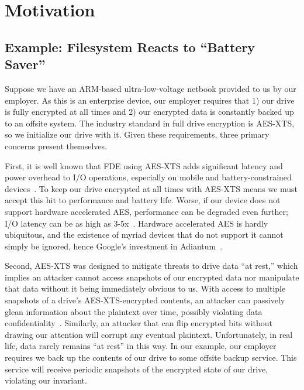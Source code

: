 \section{Motivation}\label{sec:motivation}

\subsection{Example: Filesystem Reacts to ``Battery Saver''}


Suppose we have an ARM-based ultra-low-voltage netbook provided to us by our
employer. As this is an enterprise device, our employer requires that 1) our
drive is fully encrypted at all times and 2) our encrypted data is constantly
backed up to an offsite system. The industry standard in full drive encryption
is AES-XTS, so we initialize our drive with it. Given these requirements, three
primary concerns present themselves.

First, it is well known that FDE using AES-XTS adds significant latency and
power overhead to I/O operations, especially on mobile and battery-constrained
devices~\cite{google-engadget, android-M-mobile-motivation,
android-M-mobile-motivation-2}. To keep our drive encrypted at all times with
AES-XTS means we must accept this hit to performance and battery life. Worse, if
our device does not support hardware accelerated AES, performance can be
degraded even further; I/O latency can be as high as 3-5x~\cite{StrongBox}.
Hardware accelerated AES is hardly ubiquitous, and the existence of myriad
devices that do not support it cannot simply be ignored, hence Google's
investment in Adiantum~\cite{Adiantum}.

Second, AES-XTS was designed to mitigate threats to drive data ``at rest,''
which implies an attacker cannot access snapshots of our encrypted data nor
manipulate that data without it being immediately obvious to us. With access to
multiple snapshots of a drive's AES-XTS-encrypted contents, an attacker can
passively glean information about the plaintext over time, possibly violating
data confidentiality~\cite{XEX, XTS}. Similarly, an attacker that can flip
encrypted bits without drawing our attention will corrupt any eventual
plaintext. Unfortunately, in real life, data rarely remains ``at rest'' in this
way. In our example, our employer requires we back up the contents of our drive
to some offsite backup service. This service will receive periodic snapshots of
the encrypted state of our drive, violating our invariant.

